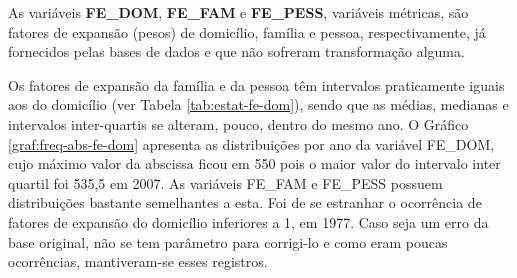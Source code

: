 \newpage
As variáveis \textbf{FE_DOM}, \textbf{FE_FAM} e \textbf{FE_PESS}, variáveis métricas, são fatores de expansão (pesos) de domicílio, família e pessoa, respectivamente, já fornecidos pelas bases de dados e que não sofreram transformação alguma.

Os fatores de expansão da família e da pessoa têm intervalos praticamente iguais aos do domicílio (ver Tabela \ref{tab:estat-fe-dom}), sendo que as médias, medianas e intervalos inter-quartis se alteram, pouco, dentro do mesmo ano.
O Gráfico \ref{graf:freq-abs-fe-dom} apresenta as distribuições por ano da variável FE_DOM, cujo máximo valor da abscissa ficou em 550 pois o maior valor do intervalo inter quartil foi 535,5 em 2007. As variáveis FE_FAM e FE_PESS possuem distribuições bastante semelhantes a esta. Foi de se estranhar o ocorrência de fatores de expansão do domicílio inferiores a 1, em 1977. Caso seja um erro da base original, não se tem parâmetro para corrigi-lo e como eram poucas ocorrências, mantiveram-se esses registros.


\begin{table}[htb]
\centering

\end{table}

